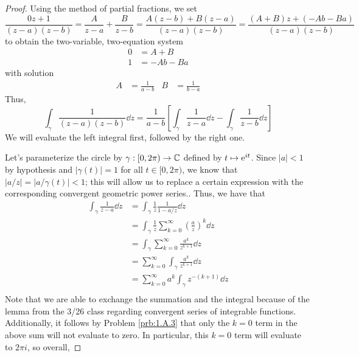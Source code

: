 \documentclass[../psets.tex]{subfiles}
\begin{document}
\begin{enumerate}[ref={A.\arabic*}]
\begin{proof}
        Using the method of partial fractions, we set
        \begin{equation*}
            \frac{0z+1}{(z-a)(z-b)} = \frac{A}{z-a}+\frac{B}{z-b}
            = \frac{A(z-b)+B(z-a)}{(z-a)(z-b)}
            = \frac{(A+B)z+(-Ab-Ba)}{(z-a)(z-b)}
        \end{equation*}
        to obtain the two-variable, two-equation system
        \begin{align*}
            0 &= A+B\\
            1 &= -Ab-Ba
        \end{align*}
        with solution
        \begin{align*}
            A &= \frac{1}{a-b}&
            B &= \frac{1}{b-a}
        \end{align*}
        Thus,
        \begin{equation*}
            \int_\gamma\frac{1}{(z-a)(z-b)}\dd{z} = \frac{1}{a-b}\left[ \int_\gamma\frac{1}{z-a}\dd{z}-\int_\gamma\frac{1}{z-b}\dd{z} \right]
        \end{equation*}
        We will evaluate the left integral first, followed by the right one.\par
        Let's parameterize the circle by $\gamma:[0,2\pi)\to\C$ defined by $t\mapsto\e[it]$. Since $|a|<1$ by hypothesis and $|\gamma(t)|=1$ for all $t\in[0,2\pi)$, we know that $|a/z|=|a/\gamma(t)|<1$; this will allow us to replace a certain expression with the corresponding convergent geometric power series.. Thus, we have that
        \begin{align*}
            \int_\gamma\frac{1}{z-a}\dd{z} &= \int_\gamma\frac{1}{z}\frac{1}{1-a/z}\dd{z}\\
            &= \int_\gamma\frac{1}{z}\sum_{k=0}^\infty\left( \frac{a}{z} \right)^k\dd{z}\\
            &= \int_\gamma\sum_{k=0}^\infty\frac{a^k}{z^{k+1}}\dd{z}\\
            &= \sum_{k=0}^\infty\int_\gamma\frac{a^k}{z^{k+1}}\dd{z}\\
            &= \sum_{k=0}^\infty a^k\int_\gamma z^{-(k+1)}\dd{z}\\
        \end{align*}
        Note that we are able to exchange the summation and the integral because of the lemma from the 3/26 class regarding convergent series of integrable functions. Additionally, it follows by Problem \ref{prb:1.A.3} that only the $k=0$ term in the above sum will not evaluate to zero. In particular, this $k=0$ term will evaluate to $2\pi i$, so overall,

\end{proof}
\end{enumerate}
\end{document}
